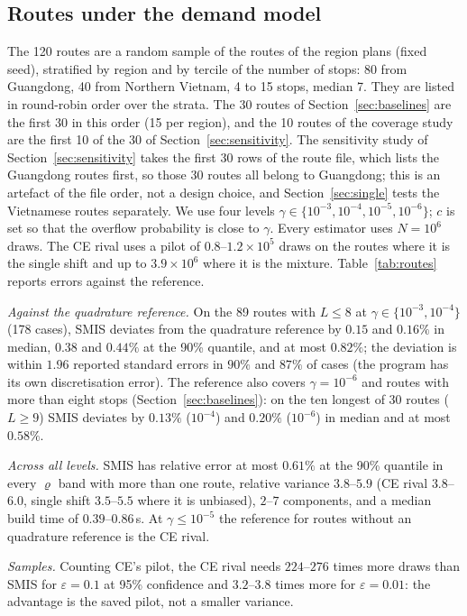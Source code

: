 \documentclass[11pt]{article}
\theoremstyle{definition}
\theoremstyle{remark}
\begin{document}
\subsection{Routes under the demand model}
\label{sec:routes}
The 120 routes are a random sample of the routes of the region plans (fixed
seed), stratified by region and by tercile of the number of stops: 80 from
Guangdong, 40 from Northern Vietnam, 4 to 15 stops, median 7. They are listed in
round-robin order over the strata. The 30 routes of Section~\ref{sec:baselines}
are the first 30 in this order (15 per region), and the 10 routes of the
coverage study are the first 10 of the 30 of Section~\ref{sec:sensitivity}.
The sensitivity study of Section~\ref{sec:sensitivity} takes the first 30 rows
of the route file, which lists the Guangdong routes first, so those 30 routes
all belong to Guangdong; this is an artefact of the file order, not a design
choice, and Section~\ref{sec:single} tests the Vietnamese routes separately.
We use four levels $\gamma\in\{10^{-3},10^{-4},10^{-5},10^{-6}\}$; $c$ is set so
that the overflow probability is close to $\gamma$. Every estimator uses
$N=10^6$ draws. The CE rival uses a pilot of $0.8$--$1.2\times10^5$ draws on
the routes where it is the single shift and up to $3.9\times10^6$ where it is the
mixture. Table~\ref{tab:routes} reports errors against the reference.

\emph{Against the quadrature reference.} On the 89 routes with $L\le8$ at
$\gamma\in\{10^{-3},10^{-4}\}$ (178 cases), SMIS deviates from the quadrature
reference by $0.15$ and $0.16\%$ in median, $0.38$ and $0.44\%$ at the
90\% quantile, and at most $0.82\%$; the deviation is within $1.96$ reported
standard errors in $90\%$ and $87\%$ of cases (the program has its own
discretisation error). The reference also covers $\gamma=10^{-6}$ and
routes with more than eight stops (Section~\ref{sec:baselines}): on the ten
longest of 30 routes ($L\ge9$) SMIS deviates by $0.13\%$ ($10^{-4}$) and
$0.20\%$ ($10^{-6}$) in median and at most $0.58\%$.

\emph{Across all levels.} SMIS has relative error at most $0.61\%$ at the
90\% quantile in every $\varrho$ band with more than one route, relative
variance $3.8$--$5.9$ (CE rival $3.8$--$6.0$, single shift $3.5$--$5.5$
where it is unbiased), $2$--$7$ components, and a median build time of
$0.39$--$0.86$\,s. At $\gamma\le10^{-5}$ the reference for routes without an
quadrature reference is the CE rival.

\emph{Samples.} Counting CE's pilot, the CE rival needs $224$--$276$ times
more draws than SMIS for $\varepsilon=0.1$ at 95\% confidence and $3.2$--$3.8$
times more for $\varepsilon=0.01$: the advantage is the saved pilot, not a
smaller variance.
\end{document}
